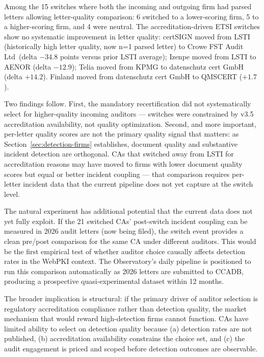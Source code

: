 \documentclass[10pt,twocolumn,letterpaper]{article}
\begin{document}
Among the 15 switches where both the incoming and outgoing firm had
parsed letters allowing letter-quality comparison: 6 switched to a
lower-scoring firm, 5 to a higher-scoring firm, and 4 were neutral.
The accreditation-driven ETSI switches show no systematic improvement
in letter quality: certSIGN moved from LSTI (historically high letter quality,
now n=1 parsed letter) to
Crowe FST Audit Ltd\ (delta $-34.8$ points versus prior LSTI average); Izenpe moved from LSTI
to AENOR (delta $-12.9$); Telia moved from KPMG to datenschutz cert
GmbH (delta $+14.2$). Finland moved from datenschutz cert GmbH to
QMSCERT ($+1.7$).

Two findings follow. First, the mandatory recertification did not
systematically select for higher-quality incoming auditors ---
switches were constrained by v3.5 accreditation availability, not
quality optimization. Second, and more important, per-letter quality
scores are not the primary quality signal that matters: as
Section~\ref{sec:detection-firms} establishes, document quality and
substantive incident detection are orthogonal. CAs that switched away from LSTI
for accreditation reasons may have moved to firms with lower document
quality scores but equal or better incident coupling --- that comparison
requires per-letter incident data that the current pipeline does not
yet capture at the switch level.

The natural experiment has additional potential that the current
data does not yet fully exploit. If the 21 switched CAs' post-switch
incident coupling can be measured in 2026 audit letters (now being
filed), the switch event provides a clean pre/post comparison for
the same CA under different auditors. This would be the first
empirical test of whether auditor choice causally affects detection
rates in the WebPKI context. The Observatory's daily pipeline is
positioned to run this comparison automatically as 2026 letters
are submitted to CCADB, producing a prospective quasi-experimental
dataset within 12 months.

The broader implication is structural: if the primary driver of
auditor selection is regulatory accreditation compliance rather than
detection quality, the market mechanism that would reward
high-detection firms cannot function. CAs have limited ability to
select on detection quality because (a) detection rates are not
published, (b) accreditation availability constrains the choice set,
and (c) the audit engagement is priced and scoped before detection
outcomes are observable.
\label{sec:discuss}
\end{document}
